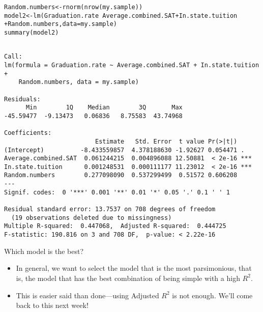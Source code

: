 \documentclass{beamer}\usepackage[]{graphicx}\usepackage[]{color}
\makeatletter
\newcommand{\hlopt}[1]{\textcolor[rgb]{1,0.894,0.769}{#1}}%
\newcommand{\hlstd}[1]{\textcolor[rgb]{1,0.894,0.769}{#1}}%
\newcommand{\hlkwb}[1]{\textcolor[rgb]{0.804,0.776,0.451}{#1}}%
\newcommand{\hlkwc}[1]{\textcolor[rgb]{0.78,0.941,0.545}{#1}}%
\newcommand{\hlkwd}[1]{\textcolor[rgb]{1,0.78,0.769}{#1}}%
\newenvironment{kframe}{%
 \def\at@end@of@kframe{}%
 \ifinner\ifhmode%
  \def\at@end@of@kframe{\end{minipage}}%
  \begin{minipage}{\columnwidth}%
 \fi\fi%
 \def\FrameCommand##1{\hskip\@totalleftmargin \hskip-\fboxsep
 \colorbox{shadecolor}{##1}\hskip-\fboxsep
     \hskip-\linewidth \hskip-\@totalleftmargin \hskip\columnwidth}%
 \MakeFramed {\advance\hsize-\width
   \@totalleftmargin\z@ \linewidth\hsize
   \@setminipage}}%
 {\par\unskip\endMakeFramed%
 \at@end@of@kframe}
\newenvironment{knitrout}{}{} %
\makeatother
\begin{document}
\begin{darkframes}
    \begin{frame}[fragile]
      \fontsize{8}{8}
\begin{knitrout}
\color{fgcolor}\begin{kframe}
\begin{alltt}
\hlstd{Random.numbers} \hlkwb{<-} \hlkwd{rnorm}\hlstd{(}\hlkwd{nrow}\hlstd{(my.sample))}
\hlstd{model2} \hlkwb{<-} \hlkwd{lm}\hlstd{(Graduation.rate} \hlopt{~} \hlstd{Average.combined.SAT} \hlopt{+} \hlstd{In.state.tuition}
               \hlopt{+} \hlstd{Random.numbers,} \hlkwc{data}\hlstd{=my.sample)}
\hlkwd{summary}\hlstd{(model2)}
\end{alltt}
\begin{verbatim}

Call:
lm(formula = Graduation.rate ~ Average.combined.SAT + In.state.tuition + 
    Random.numbers, data = my.sample)

Residuals:
      Min        1Q    Median        3Q       Max 
-45.59477  -9.13473   0.06836   8.75583  43.74968 

Coefficients:
                         Estimate   Std. Error  t value Pr(>|t|)    
(Intercept)          -8.433559857  4.378188630 -1.92627 0.054471 .  
Average.combined.SAT  0.061244215  0.004896088 12.50881  < 2e-16 ***
In.state.tuition      0.001248531  0.000111177 11.23012  < 2e-16 ***
Random.numbers        0.277098090  0.537299499  0.51572 0.606208    
---
Signif. codes:  0 '***' 0.001 '**' 0.01 '*' 0.05 '.' 0.1 ' ' 1

Residual standard error: 13.7537 on 708 degrees of freedom
  (19 observations deleted due to missingness)
Multiple R-squared:  0.447068,	Adjusted R-squared:  0.444725 
F-statistic: 190.816 on 3 and 708 DF,  p-value: < 2.22e-16
\end{verbatim}
\end{kframe}
\end{knitrout}
    \end{frame}

    \begin{frame}{Which model is the best?}
      \begin{itemize}[<+->]
        \item In general, we want to select the model that is the most \alert{parsimonious}, that is, the model that has the best combination of being simple with a high $R^2$.
        \item This is easier said than done---using Adjusted $R^2$ is not enough. We'll come back to this next week!
      \end{itemize}
    \end{frame}


\end{darkframes}
\end{document}

